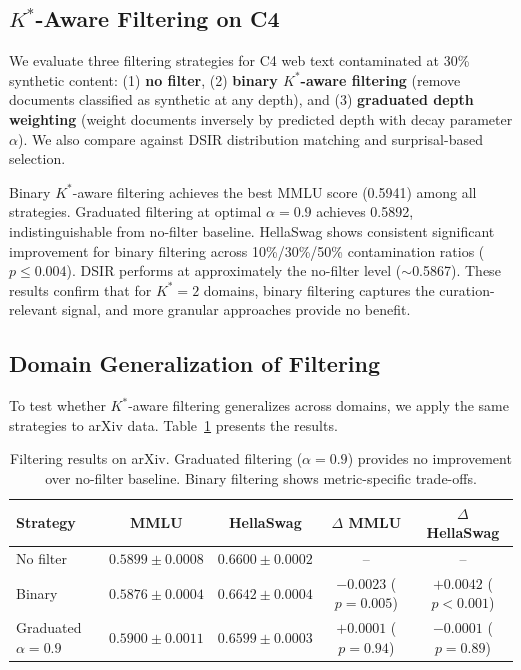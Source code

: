 \documentclass[11pt]{article}
\begin{document}
\subsection{$K^*$-Aware Filtering on C4}

We evaluate three filtering strategies for C4 web text contaminated at 30\% synthetic content: (1) \textbf{no filter}, (2) \textbf{binary $K^*$-aware filtering} (remove documents classified as synthetic at any depth), and (3) \textbf{graduated depth weighting} (weight documents inversely by predicted depth with decay parameter $\alpha$). We also compare against DSIR distribution matching and surprisal-based selection.

Binary $K^*$-aware filtering achieves the best MMLU score (0.5941) among all strategies. Graduated filtering at optimal $\alpha{=}0.9$ achieves 0.5892, indistinguishable from no-filter baseline. HellaSwag shows consistent significant improvement for binary filtering across 10\%/30\%/50\% contamination ratios ($p \le 0.004$). DSIR performs at approximately the no-filter level ($\sim$0.5867). These results confirm that for $K^*{=}2$ domains, binary filtering captures the curation-relevant signal, and more granular approaches provide no benefit.

\subsection{Domain Generalization of Filtering}
\label{sec:domain-filtering}

To test whether $K^*$-aware filtering generalizes across domains, we apply the same strategies to arXiv data. Table~\ref{tab:arxiv-filtering} presents the results.

\begin{table}[t]
\centering
\caption{Filtering results on arXiv. Graduated filtering ($\alpha{=}0.9$) provides no improvement over no-filter baseline. Binary filtering shows metric-specific trade-offs.}
\label{tab:arxiv-filtering}
\small
\begin{tabular}{lcccc}
\toprule
Strategy & MMLU & HellaSwag & $\Delta$ MMLU & $\Delta$ HellaSwag \\
\midrule
No filter & $0.5899 \pm 0.0008$ & $0.6600 \pm 0.0002$ & -- & -- \\
Binary & $0.5876 \pm 0.0004$ & $0.6642 \pm 0.0004$ & $-0.0023$ ($p{=}0.005$) & $+0.0042$ ($p{<}0.001$) \\
Graduated $\alpha{=}0.9$ & $0.5900 \pm 0.0011$ & $0.6599 \pm 0.0003$ & $+0.0001$ ($p{=}0.94$) & $-0.0001$ ($p{=}0.89$) \\
\bottomrule
\end{tabular}
\end{table}
\end{document}

